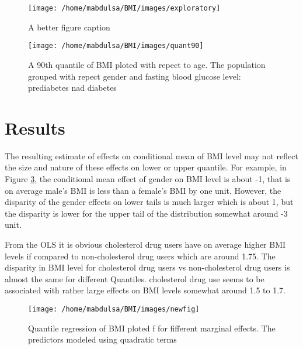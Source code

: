 \documentclass[
  12pt,
]{article}
\begin{document}
\begin{figure}

{\centering \texttt{[image: /home/mabdulsa/BMI/images/exploratory]} 

}

\caption{A better figure caption}\label{fig:data}
\end{figure}

\begin{figure}

{\centering \texttt{[image: /home/mabdulsa/BMI/images/quant90]} 

}

\caption{A 90th quantile of BMI ploted with repect to age. The population grouped with repect gender and fasting blood glucose level: prediabetes nad diabetes}\label{fig:unnamed-chunk-1}
\end{figure}

\section{Results}

The resulting estimate of effects on conditional mean of BMI level may not reflect the size and nature of these effects on lower or upper quantile. For example, in Figure \ref{fig:resu1}, the conditional mean effect of gender on BMI level is about -1, that is on average male's BMI is less than a female's BMI by one unit. However, the disparity of the gender effects on lower tails is much larger which is about 1, but the disparity is lower for the upper tail of the distribution somewhat around -3 unit.

From the OLS it is obvious cholesterol drug users have on average higher BMI levels if compared to non-cholesterol drug users which are around 1.75. The disparity in BMI level for cholesterol drug users vs non-cholesterol drug users is almost the same for different Quantiles. cholesterol drug use seems to be associated with rather large effects on BMI levels somewhat around 1.5 to 1.7.

\begin{figure}

{\centering \texttt{[image: /home/mabdulsa/BMI/images/newfig]} 

}

\caption{Quantile regression of BMI ploted f for fifferent marginal effects. The predictors modeled using quadratic terms }\label{fig:resu1}
\end{figure}
\end{document}
